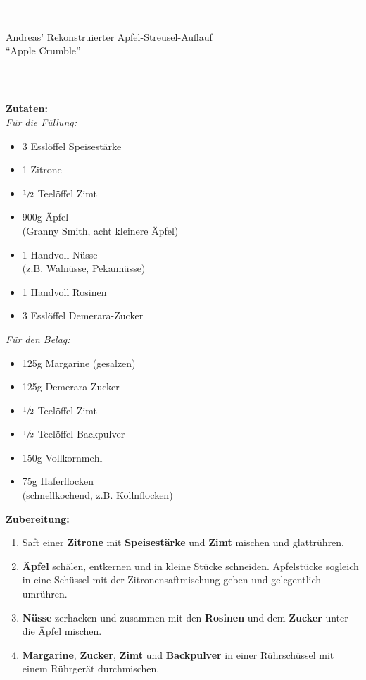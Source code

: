 \documentclass[11pt,a4paper]{article}
\author{Andreas Stöckel}
\begin{document}
	\pagestyle{empty}
	{\Large\bf\centering
	\rule{5cm}{1pt}\\
	Andreas' Rekonstruierter Apfel-Streusel-Auflauf\\\enquote{Apple Crumble}\\[-0.25cm]
	\rule{5cm}{1pt}\\
	}

	\begin{multicols}{2}
	\textbf{Zutaten:}\\
	\textit{Für die Füllung:}
	\begin{itemize}
		\item 3 Esslöffel Speisestärke
		\item 1 Zitrone
		\item $\sfrac{1}2$ Teelöffel Zimt
		\item 900g Äpfel\\(Granny Smith, acht kleinere Äpfel)
		\item 1 Handvoll Nüsse\\(z.B. Walnüsse, Pekannüsse)
		\item 1 Handvoll Rosinen
		\item 3 Esslöffel Demerara-Zucker
	\end{itemize}
	\textit{Für den Belag:}
	\begin{itemize}
		\item 125g Margarine (gesalzen)
		\item 125g Demerara-Zucker
		\item $\sfrac{1}2$ Teelöffel Zimt
		\item $\sfrac{1}2$ Teelöffel Backpulver
		\item 150g Vollkornmehl
		\item 75g Haferflocken\\(schnellkochend, z.B. Köllnflocken)
	\end{itemize}
	\vfill
	\columnbreak
	\textbf{Zubereitung:}
	\begin{enumerate}
		\item Saft einer \textbf{Zitrone} mit \textbf{Speisestärke} und \textbf{Zimt} mischen und glattrühren.
		\item \textbf{Äpfel} schälen, entkernen und in kleine Stücke schneiden. Apfelstücke sogleich in eine Schüssel mit der Zitronensaftmischung geben und gelegentlich umrühren.
		\item \textbf{Nüsse} zerhacken und zusammen mit den \textbf{Rosinen} und dem \textbf{Zucker} unter die Äpfel mischen.
		\item \textbf{Margarine}, \textbf{Zucker}, \textbf{Zimt} und \textbf{Backpulver} in einer Rührschüssel mit einem Rührgerät durchmischen.

\end{enumerate}
\end{multicols}
\end{document}
